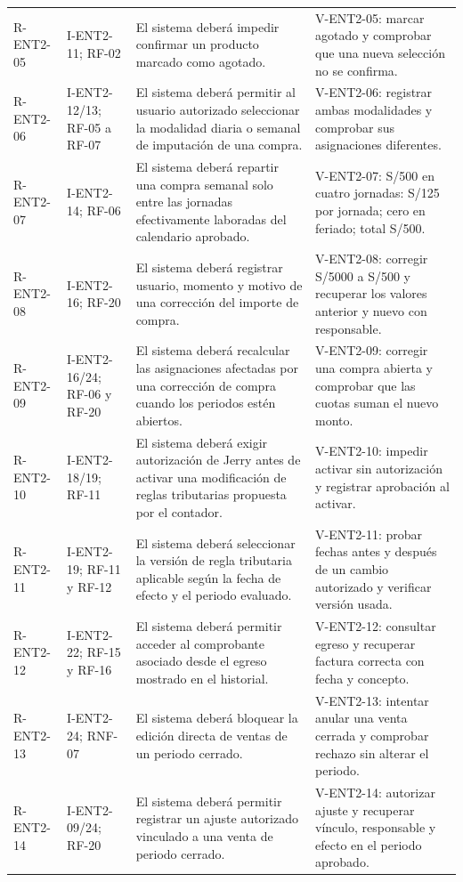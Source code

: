{\begin{longtable}{L{2.05cm} L{2.75cm} L{6.0cm} L{3.4cm}}
R-ENT2-05 & I-ENT2-11; RF-02 & El sistema deberá impedir confirmar un producto marcado como agotado. & V-ENT2-05: marcar agotado y comprobar que una nueva selección no se confirma. \\
R-ENT2-06 & I-ENT2-12/13; RF-05 a RF-07 & El sistema deberá permitir al usuario autorizado seleccionar la modalidad diaria o semanal de imputación de una compra. & V-ENT2-06: registrar ambas modalidades y comprobar sus asignaciones diferentes. \\
R-ENT2-07 & I-ENT2-14; RF-06 & El sistema deberá repartir una compra semanal solo entre las jornadas efectivamente laboradas del calendario aprobado. & V-ENT2-07: S/500 en cuatro jornadas: S/125 por jornada; cero en feriado; total S/500. \\
R-ENT2-08 & I-ENT2-16; RF-20 & El sistema deberá registrar usuario, momento y motivo de una corrección del importe de compra. & V-ENT2-08: corregir S/5000 a S/500 y recuperar los valores anterior y nuevo con responsable. \\
R-ENT2-09 & I-ENT2-16/24; RF-06 y RF-20 & El sistema deberá recalcular las asignaciones afectadas por una corrección de compra cuando los periodos estén abiertos. & V-ENT2-09: corregir una compra abierta y comprobar que las cuotas suman el nuevo monto. \\
R-ENT2-10 & I-ENT2-18/19; RF-11 & El sistema deberá exigir autorización de Jerry antes de activar una modificación de reglas tributarias propuesta por el contador. & V-ENT2-10: impedir activar sin autorización y registrar aprobación al activar. \\
R-ENT2-11 & I-ENT2-19; RF-11 y RF-12 & El sistema deberá seleccionar la versión de regla tributaria aplicable según la fecha de efecto y el periodo evaluado. & V-ENT2-11: probar fechas antes y después de un cambio autorizado y verificar versión usada. \\
R-ENT2-12 & I-ENT2-22; RF-15 y RF-16 & El sistema deberá permitir acceder al comprobante asociado desde el egreso mostrado en el historial. & V-ENT2-12: consultar egreso y recuperar factura correcta con fecha y concepto. \\
R-ENT2-13 & I-ENT2-24; RNF-07 & El sistema deberá bloquear la edición directa de ventas de un periodo cerrado. & V-ENT2-13: intentar anular una venta cerrada y comprobar rechazo sin alterar el periodo. \\
R-ENT2-14 & I-ENT2-09/24; RF-20 & El sistema deberá permitir registrar un ajuste autorizado vinculado a una venta de periodo cerrado. & V-ENT2-14: autorizar ajuste y recuperar vínculo, responsable y efecto en el periodo aprobado. \\

\end{longtable}}

